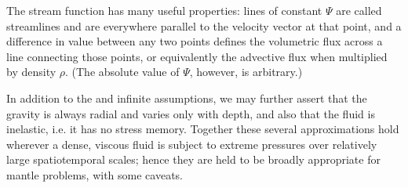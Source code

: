\documentclass[letterpaper,10pt,english]{jupyterBook}
\begin{document}
\sphinxAtStartPar
The stream function has many useful properties: lines of constant \(\Psi\) are called streamlines and are everywhere parallel to the velocity vector at that point, and a difference in value between any two points defines the volumetric flux across a line connecting those points, or equivalently the advective flux when multiplied by density \(\rho\). (The absolute value of \(\Psi\), however, is arbitrary.)

\sphinxAtStartPar
In addition to the  and infinite  assumptions, we may further assert that the gravity is always radial and varies only with depth, and also that the fluid is inelastic, i.e. it has no stress memory. Together these several approximations hold wherever a dense, viscous fluid is subject to extreme pressures over relatively large spatio\sphinxhyphen{}temporal scales; hence they are held to be broadly appropriate for mantle problems, with some caveats.
\end{document}
